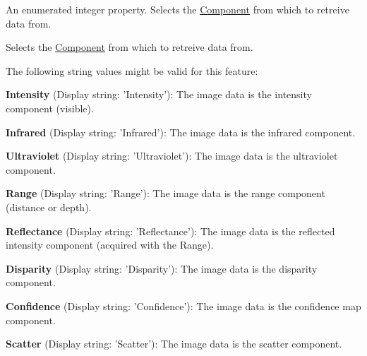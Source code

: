 An enumerated integer property. Selects the \hyperlink{classmv_i_m_p_a_c_t_1_1acquire_1_1_component}{Component} from which to retreive data from. 

Selects the \hyperlink{classmv_i_m_p_a_c_t_1_1acquire_1_1_component}{Component} from which to retreive data from.

The following string values might be valid for this feature\+:
\begin{DoxyItemize}
\item {\bfseries Intensity} (Display string\+: 'Intensity')\+: The image data is the intensity component (visible).
\item {\bfseries Infrared} (Display string\+: 'Infrared')\+: The image data is the infrared component.
\item {\bfseries Ultraviolet} (Display string\+: 'Ultraviolet')\+: The image data is the ultraviolet component.
\item {\bfseries Range} (Display string\+: 'Range')\+: The image data is the range component (distance or depth).
\item {\bfseries Reflectance} (Display string\+: 'Reflectance')\+: The image data is the reflected intensity component (acquired with the Range).
\item {\bfseries Disparity} (Display string\+: 'Disparity')\+: The image data is the disparity component.
\item {\bfseries Confidence} (Display string\+: 'Confidence')\+: The image data is the confidence map component.
\item {\bfseries Scatter} (Display string\+: 'Scatter')\+: The image data is the scatter component.
\end{DoxyItemize}

